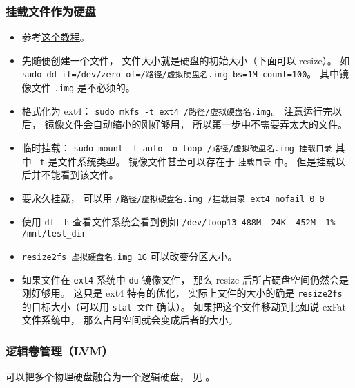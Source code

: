 \subsubsection{挂载文件作为硬盘}
\begin{itemize}
\item 参考\href{https://www.tecmint.com/create-virtual-harddisk-volume-in-linux/}{这个教程}。
\item 先随便创建一个文件， 文件大小就是硬盘的初始大小（下面可以 resize）。 如 \verb`sudo dd if=/dev/zero of=/路径/虚拟硬盘名.img bs=1M count=100`。 其中镜像文件 \verb`.img` 是不必须的。
\item 格式化为 ext4： \verb`sudo mkfs -t ext4 /路径/虚拟硬盘名.img`。 注意运行完以后， 镜像文件会自动缩小的刚好够用， 所以第一步中不需要弄太大的文件。
\item 临时挂载： \verb`sudo mount -t auto -o loop /路径/虚拟硬盘名.img 挂载目录` 其中 \verb`-t` 是文件系统类型。 镜像文件甚至可以存在于 \verb`挂载目录` 中。 但是挂载以后并不能看到该文件。
\item 要永久挂载， 可以用 \verb`/路径/虚拟硬盘名.img /挂载目录 ext4 nofail 0 0`
\item 使用 \verb`df -h` 查看文件系统会看到例如 \verb`/dev/loop13 488M  24K  452M  1% /mnt/test_dir`
\item \verb`resize2fs 虚拟硬盘名.img 1G` 可以改变分区大小。
\item 如果文件在 \verb`ext4` 系统中 \verb`du` 镜像文件， 那么 resize 后所占硬盘空间仍然会是刚好够用。 这只是 ext4 特有的优化， 实际上文件的大小的确是 \verb`resize2fs` 的目标大小（可以用 \verb`stat 文件` 确认）。 如果把这个文件移动到比如说 exFat 文件系统中， 那么占用空间就会变成后者的大小。
\end{itemize}

\subsubsection{逻辑卷管理（LVM）}
可以把多个物理硬盘融合为一个逻辑硬盘， 见 。

